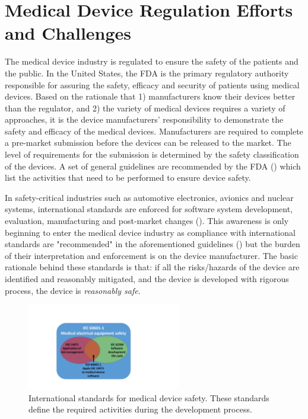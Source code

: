 \section{Medical Device Regulation Efforts and Challenges}
The medical device industry is regulated to ensure the safety of the patients and the public. In the United States, the FDA is the primary regulatory authority responsible for assuring the safety, efficacy and security of patients using medical devices. Based on the rationale that 1) manufacturers know their devices better than the regulator, and 2) the variety of medical devices requires a variety of approaches, it is the device manufacturers' responsibility to demonstrate the safety and efficacy of the medical devices. Manufacturers are required to complete a pre-market submission before the devices can be released to the market. The level of requirements for the submission is determined by the safety classification of the devices. A set of general guidelines are recommended by the FDA (\cite{fda1, fda2, fda3}) which list the activities that need to be performed to ensure device safety. 

In safety-critical industries such as automotive electronics, avionics and nuclear systems, international standards are enforced for software system development, evaluation, manufacturing and post-market changes (\cite{autosar,avsi}). This awareness is only beginning to enter the medical device industry as compliance with international standards are "recommended" in the aforementioned guidelines (\cite{formal_fda}) but the burden of their interpretation and enforcement is on the device manufacturer. The basic rationale behind these standards is that: if all the risks/hazards of the device are identified and reasonably mitigated, and the device is developed with rigorous process, the device is \emph{reasonably safe}. 
\begin{figure}[t]
		\centering
		\includegraphics[width=0.6\textwidth]{figs/stardards.pdf}
		\caption{\small International standards for medical device safety. These standards define the required activities during the development process.}
		\label{fig:standards}
\end{figure}

